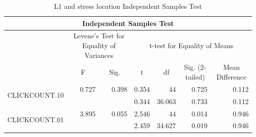 \documentclass[a4paper]{article}
\begin{document}
\begin{table}[H]
\centering
\caption{L1 and stress location Independent Samples Test}
\label{tab:independentt}
\begin{tabular}{|l|c|c|r|r|r|r|} 
\hline
\multicolumn{7}{|c|}{Independent Samples Test}                                                                                                                                                                                                                                                      \\ 
\hline
                               & \multicolumn{2}{c|}{Levene's Test for Equality of Variances} & \multicolumn{4}{c|}{t-test for Equality of Means}                                                                                                                                                   \\ 
\hline
                               & \multirow{2}{*}{F}         & \multirow{2}{*}{Sig.}           & \multicolumn{1}{c|}{\multirow{2}{*}{t}} & \multicolumn{1}{c|}{\multirow{2}{*}{df}} & \multicolumn{1}{c|}{\multirow{2}{*}{Sig. (2-tailed)}} & \multicolumn{1}{c|}{\multirow{2}{*}{Mean Difference}}  \\ 
\cline{1-1}
                               &                            &                                 & \multicolumn{1}{c|}{}                   & \multicolumn{1}{c|}{}                    & \multicolumn{1}{c|}{}                                 & \multicolumn{1}{c|}{}                                  \\ 
\hline
\multirow{2}{*}{CLICKCOUNT.10} & \multicolumn{1}{r|}{0.727} & \multicolumn{1}{r|}{0.398}      & 0.354                                   & 44                                       & 0.725                                                 & 0.112                                                  \\ 
\cline{2-7}
                               & \multicolumn{1}{l|}{~}     & \multicolumn{1}{l|}{~}          & 0.344                                   & 36.063                                   & 0.733                                                 & 0.112                                                  \\ 
\hline
\multirow{2}{*}{CLICKCOUNT.01} & \multicolumn{1}{r|}{3.895} & \multicolumn{1}{r|}{0.055}      & 2.546                                   & 44                                       & 0.014                                                 & 0.946                                                  \\ 
\cline{2-7}
                               & \multicolumn{1}{l|}{~}     & \multicolumn{1}{l|}{~}          & 2.459                                   & 34.627                                   & 0.019                                                 & 0.946                                                  \\
\hline
\end{tabular}
\end{table}
\end{document}

